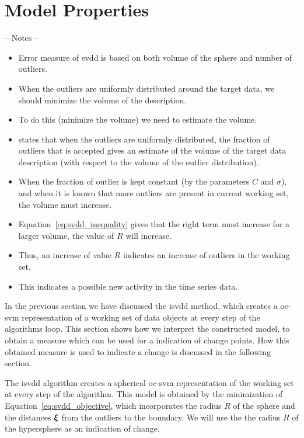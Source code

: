 \section{Model Properties}\label{sec:method_model_properties}

-- Notes --
\begin{itemize}
  \item Error measure of \gls{svdd} is based on both volume of the sphere and number of outliers.
  \item When the outliers are uniformly distributed around the target data, we should minimize the volume of the description.
  \item To do this (minimize the volume) we need to estimate the volume.
  \item \cite{tax2002uniform} states that when the outliers are uniformly distributed, the fraction of outliers that is accepted gives an estimate of the volume of the target data description (with respect to the volume of the outlier distribution).
  \item When the fraction of outlier is kept constant (by the parameters $C$ and $\sigma$), and when it is known that more outliers are present in current working set, the volume must increase.
  \item Equation~\ref{eq:svdd_inequality} gives that the right term must increase for a larger volume, \ie the value of $R$ will increase.
  \item Thus, an increase of value $R$ indicates an increase of outliers in the working set.
  \item This indicates a possible new activity in the time series data.
\end{itemize}

In the previous section we have discussed the \gls{isvdd} method, which creates a \gls{oc-svm} representation of a working set of data objects at every step of the algorithms loop.
This section shows how we interpret the constructed model, to obtain a measure which can be used for a indication of change points.
How this obtained measure is used to indicate a change is discussed in the following section.

The \gls{isvdd} algorithm creates a spherical \gls{oc-svm} representation of the working set at every step of the algorithm.
This model is obtained by the minimization of Equation~\ref{eq:svdd_objective}, which incorporates the radius $R$ of the sphere and the distances $\vectorsym{\xi}$ from the outliers to the boundary.
We will use the the radius $R$ of the hypersphere as an indication of change.

